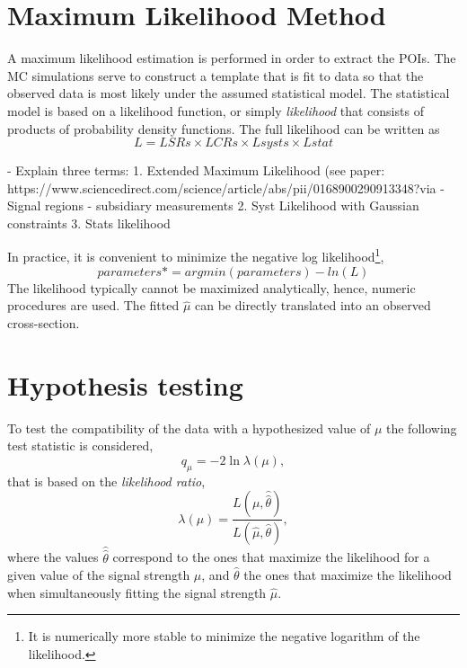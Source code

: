\section{Maximum Likelihood Method}
A maximum likelihood estimation  is performed in order to extract the POIs.
The MC simulations serve to construct a template that is fit to data so that the observed data is most likely under the assumed statistical model. 
The statistical model is based on a likelihood function, or simply \emph{likelihood} that consists of products of probability density functions. 
The full likelihood can be written as
\begin{equation}
    L = LSRs \times LCRs \times Lsysts \times Lstat
\end{equation}

- Explain three terms: 
    1. Extended Maximum Likelihood (see paper: https://www.sciencedirect.com/science/article/abs/pii/0168900290913348?via%
        - Signal regions
        - subsidiary measurements
    2. Syst Likelihood with Gaussian constraints
    3. Stats likelihood 

In practice, it is convenient to minimize the negative log likelihood\footnote{It is numerically more stable to minimize the negative logarithm of the likelihood.},
\begin{equation}
    parameters* = arg min(parameters) - ln (L)
\end{equation}
The likelihood typically cannot be maximized analytically, hence, numeric procedures are used.
The fitted $\hat{\mu}$ can be directly translated into an observed cross-section. 


\section{Hypothesis testing}
To test the compatibility of the data with a hypothesized value of $\mu$ the following test statistic is considered,
\begin{equation}
    q_\mu = -2 \ln \lambda(\mu),
\end{equation}
that is based on the \emph{likelihood ratio},
\begin{equation}
    \label{eq:likelihoodratio}
    \lambda(\mu) = \frac{ L \left( \mu, \hat{\hat{\theta}} \right) } { L \left( \hat{\mu} , \hat{\theta} \right) },
\end{equation}
where the values $\hat{\hat{\theta}}$ correspond to the ones that maximize the likelihood for a given value of the signal strength $\mu$, and $\hat{\theta}$ the ones that maximize the likelihood when simultaneously fitting the signal strength $\hat{\mu}$.

